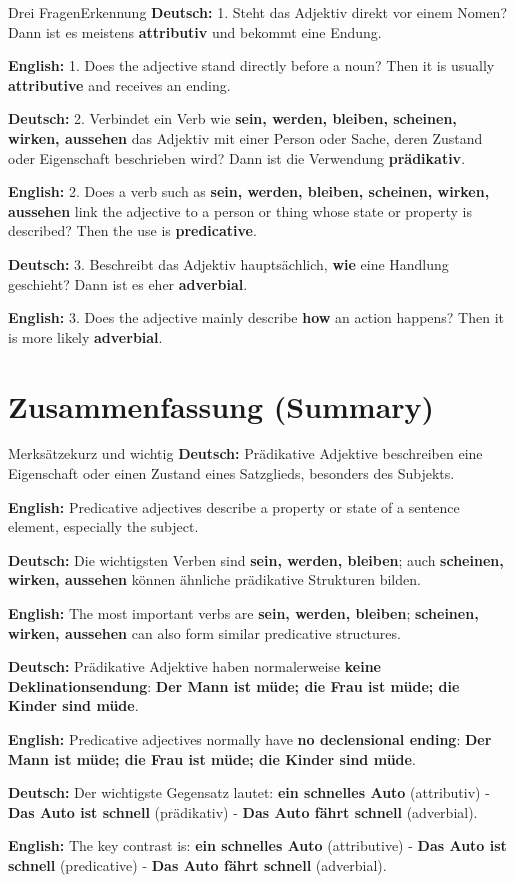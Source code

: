 \documentclass[a4paper,11pt]{article}
\newcommand{\GermanText}[1]{\textbf{Deutsch: }#1\par}
\newcommand{\EnglishText}[1]{{\small\color{SoftGray}\textbf{English: }#1\par}}
\begin{document}
        \begin{grammarentry}{Drei Fragen}{Erkennung}
            \GermanText{1. Steht das Adjektiv direkt vor einem Nomen? Dann ist es meistens \textbf{attributiv} und bekommt eine Endung.}
            \EnglishText{1. Does the adjective stand directly before a noun? Then it is usually \textbf{attributive} and receives an ending.}

            \GermanText{2. Verbindet ein Verb wie \textbf{sein, werden, bleiben, scheinen, wirken, aussehen} das Adjektiv mit einer Person oder Sache, deren Zustand oder Eigenschaft beschrieben wird? Dann ist die Verwendung \textbf{prädikativ}.}
            \EnglishText{2. Does a verb such as \textbf{sein, werden, bleiben, scheinen, wirken, aussehen} link the adjective to a person or thing whose state or property is described? Then the use is \textbf{predicative}.}

            \GermanText{3. Beschreibt das Adjektiv hauptsächlich, \textbf{wie} eine Handlung geschieht? Dann ist es eher \textbf{adverbial}.}
            \EnglishText{3. Does the adjective mainly describe \textbf{how} an action happens? Then it is more likely \textbf{adverbial}.}
        \end{grammarentry}

    \section{Zusammenfassung \textnormal{(Summary)}}

        \begin{grammarentry}{Merksätze}{kurz und wichtig}
            \GermanText{Prädikative Adjektive beschreiben eine Eigenschaft oder einen Zustand eines Satzglieds, besonders des Subjekts.}
            \EnglishText{Predicative adjectives describe a property or state of a sentence element, especially the subject.}

            \GermanText{Die wichtigsten Verben sind \textbf{sein, werden, bleiben}; auch \textbf{scheinen, wirken, aussehen} können ähnliche prädikative Strukturen bilden.}
            \EnglishText{The most important verbs are \textbf{sein, werden, bleiben}; \textbf{scheinen, wirken, aussehen} can also form similar predicative structures.}

            \GermanText{Prädikative Adjektive haben normalerweise \textbf{keine Deklinationsendung}: \textbf{Der Mann ist müde; die Frau ist müde; die Kinder sind müde}.}
            \EnglishText{Predicative adjectives normally have \textbf{no declensional ending}: \textbf{Der Mann ist müde; die Frau ist müde; die Kinder sind müde}.}

            \GermanText{Der wichtigste Gegensatz lautet: \textbf{ein schnelles Auto} (attributiv) - \textbf{Das Auto ist schnell} (prädikativ) - \textbf{Das Auto fährt schnell} (adverbial).}
            \EnglishText{The key contrast is: \textbf{ein schnelles Auto} (attributive) - \textbf{Das Auto ist schnell} (predicative) - \textbf{Das Auto fährt schnell} (adverbial).}
        \end{grammarentry}
\end{document}
